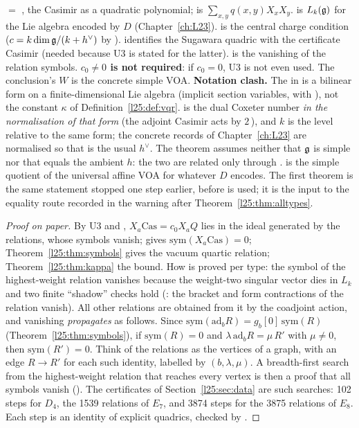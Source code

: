 \begin{dictionary}
 $=$ , the Casimir as a quadratic polynomial;  is
$\sum_{x,y}q(x,y)X_xX_y$.  is $L_k(\mathfrak g)$ for the Lie algebra encoded by $D$
(Chapter~\ref{ch:L23}).  is the central charge condition ($c=k\dim\mathfrak g/(k+h^\vee)$ by
).  identifies the Sugawara quadric with the certificate Casimir (needed because
U3 is stated for the latter).  is the vanishing of the relation symbols. \textbf{$c_0\ne0$ is not required}:
if $c_0=0$, U3 is not even used. The conclusion's $W$ is the concrete simple VOA. \textbf{Notation clash.} The
 in  is a bilinear form  on a finite-dimensional
Lie algebra  (implicit section variables, with \lean{[FiniteDimensional ℂ 𝔤]}), not the constant $\kappa$ of
Definition~\ref{l25:def:vqr}.  is the dual Coxeter number \emph{in the normalisation of that form} (the
adjoint Casimir acts by $2\,$), and $k$ is the level relative to the same form; the concrete records of
Chapter~\ref{ch:L23} are normalised so that  is the usual $h^\vee$. The theorem assumes neither that
$\mathfrak g$ is simple nor that  equals the ambient $h$: the two are related only through .
 is the simple quotient of the universal affine VOA for whatever $D$ encodes. The first
theorem is the same statement stopped one step earlier, before  is used; it is the input to the equality
route recorded in the warning after Theorem~\ref{l25:thm:alltypes}.
\end{dictionary}
\begin{proof}[Proof on paper]
By U3 and , $X_a\mathrm{Cas}=c_0X_aQ$ lies in the ideal generated by the relations, whose symbols vanish;
 gives $\mathrm{sym}(X_a\mathrm{Cas})=0$; Theorem~\ref{l25:thm:symbols} gives the vacuum
quartic relation; Theorem~\ref{l25:thm:kappa} the bound. How  is proved per type: the symbol of the
highest-weight relation vanishes because the weight-two singular vector dies in $L_k$ and two finite ``shadow''
checks hold (: the bracket and form contractions of the relation vanish). All other relations are
obtained from it by the coadjoint action, and vanishing \emph{propagates} as follows. Since
$\mathrm{sym}(\mathrm{ad}_b R)=g_b[0]\,\mathrm{sym}(R)$ (Theorem~\ref{l25:thm:symbols}), if $\mathrm{sym}(R)=0$ and
$\lambda\,\mathrm{ad}_bR=\mu\,R'$ with $\mu\ne0$, then $\mathrm{sym}(R')=0$. Think of the relations as the vertices of a
graph, with an edge $R\to R'$ for each such identity, labelled by $(b,\lambda,\mu)$. A breadth-first search from the
highest-weight relation that reaches every vertex is then a proof that all symbols vanish (). The
certificates of Section~\ref{l25:sec:data} are such searches: 102 steps for $D_4$, the 1539 relations of $E_7$, and
3874 steps for the 3875 relations of $E_8$. Each step is an identity of explicit quadrics, checked by
.
\end{proof}
